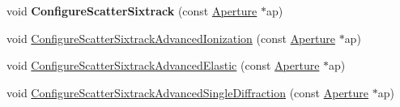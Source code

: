 \begin{DoxyCompactItemize}
\item 
\mbox{\label{classParticleTracking_1_1ProtonBunch_acfb35df65c549dc6cc02319325fce608}} 
void {\bfseries Configure\+Scatter\+Sixtrack} (const \hyperlink{classAperture}{Aperture} $\ast$ap)
\item 
void \hyperlink{classParticleTracking_1_1ProtonBunch_ab93e9a177d2a1b0e28983a8f59ef1e58}{Configure\+Scatter\+Sixtrack\+Advanced\+Ionization} (const \hyperlink{classAperture}{Aperture} $\ast$ap)
\item 
void \hyperlink{classParticleTracking_1_1ProtonBunch_a00346d5259395ac42034ab42f1f60a46}{Configure\+Scatter\+Sixtrack\+Advanced\+Elastic} (const \hyperlink{classAperture}{Aperture} $\ast$ap)
\item 
void \hyperlink{classParticleTracking_1_1ProtonBunch_a143508031aacba959d04fd0a397039be}{Configure\+Scatter\+Sixtrack\+Advanced\+Single\+Diffraction} (const \hyperlink{classAperture}{Aperture} $\ast$ap)
\end{DoxyCompactItemize}
